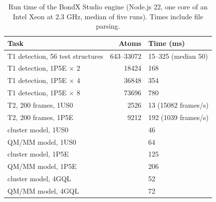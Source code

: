 \documentclass[journal=jcisd8,manuscript=suppinfo]{achemso}
\newcommand{\BX}{BondX Studio}
\begin{document}
\begin{singlespace}
\begin{table}[!htbp]\centering\footnotesize
\caption{Run time of the \BX{} engine (Node.js 22, one core of an Intel Xeon at 2.3 GHz, median of five runs). Times include file parsing.}\label{tab:perf}
\begin{tabular}{lrl}\toprule Task & Atoms & Time (ms)\\\midrule
T1 detection, 56 test structures & 643--33072 & 15--325 (median 50)\\
T1 detection, 1P5E $\times$ 2 & 18424 & 168\\
T1 detection, 1P5E $\times$ 4 & 36848 & 354\\
T1 detection, 1P5E $\times$ 8 & 73696 & 780\\
T2, 200 frames, 1US0 & 2526 & 13 (15082 frames/s)\\
T2, 200 frames, 1P5E & 9212 & 192 (1039 frames/s)\\
cluster model, 1US0 &  & 46\\
QM/MM model, 1US0 &  & 64\\
cluster model, 1P5E &  & 125\\
QM/MM model, 1P5E &  & 206\\
cluster model, 4GQL &  & 52\\
QM/MM model, 4GQL &  & 72\\
\bottomrule\end{tabular}\end{table}


\end{singlespace}
\end{document}
